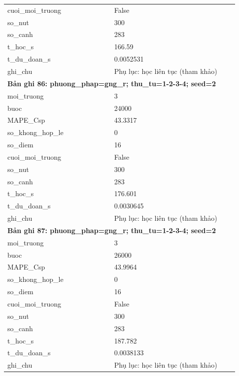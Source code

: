 \begin{longtable}{p{0.43\linewidth}p{0.50\linewidth}}
cuoi\_\allowbreak moi\_\allowbreak truong & False \\
so\_\allowbreak nut & 300 \\
so\_\allowbreak canh & 283 \\
t\_\allowbreak hoc\_\allowbreak s & 166.59 \\
t\_\allowbreak du\_\allowbreak doan\_\allowbreak s & 0.0052531 \\
ghi\_\allowbreak chu & Phụ lục: học liên tục (tham khảo) \\
\midrule
\multicolumn{2}{p{0.95\linewidth}}{\textbf{Bản ghi 86: phuong\_phap=gng\_r; thu\_tu=1-2-3-4; seed=2}} \\
moi\_\allowbreak truong & 3 \\
buoc & 24000 \\
MAPE\_\allowbreak Csp & 43.3317 \\
so\_\allowbreak khong\_\allowbreak hop\_\allowbreak le & 0 \\
so\_\allowbreak diem & 16 \\
cuoi\_\allowbreak moi\_\allowbreak truong & False \\
so\_\allowbreak nut & 300 \\
so\_\allowbreak canh & 283 \\
t\_\allowbreak hoc\_\allowbreak s & 176.601 \\
t\_\allowbreak du\_\allowbreak doan\_\allowbreak s & 0.0030645 \\
ghi\_\allowbreak chu & Phụ lục: học liên tục (tham khảo) \\
\midrule
\multicolumn{2}{p{0.95\linewidth}}{\textbf{Bản ghi 87: phuong\_phap=gng\_r; thu\_tu=1-2-3-4; seed=2}} \\
moi\_\allowbreak truong & 3 \\
buoc & 26000 \\
MAPE\_\allowbreak Csp & 43.9964 \\
so\_\allowbreak khong\_\allowbreak hop\_\allowbreak le & 0 \\
so\_\allowbreak diem & 16 \\
cuoi\_\allowbreak moi\_\allowbreak truong & False \\
so\_\allowbreak nut & 300 \\
so\_\allowbreak canh & 283 \\
t\_\allowbreak hoc\_\allowbreak s & 187.782 \\
t\_\allowbreak du\_\allowbreak doan\_\allowbreak s & 0.0038133 \\
ghi\_\allowbreak chu & Phụ lục: học liên tục (tham khảo) \\

\end{longtable}
